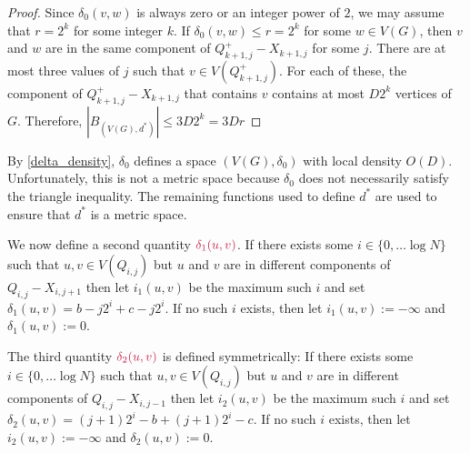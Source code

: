 \documentclass{patmorin}
\makeatletter
\renewcommand{\ge}{\geqslant}
\renewcommand{\le}{\leqslant}
\newcommand{\pat}[1]{\textcolor{Blue}{Pat: #1}}
\newcommand{\gwen}[1]{\textcolor{Purple}{Gwen: #1}}
\def\mathcolor#1#{\@mathcolor{#1}}
\def\@mathcolor#1#2#3{%
  \protect\leavevmode
  \begingroup
    \color#1{#2}#3%
  \endgroup
}
\newcommand{\mathdefin}[1]{\mathcolor{brightmaroon}{#1}}
\makeatother
\begin{document}
\begin{proof}
  Since $\delta_0(v,w)$ is always zero or an integer power of $2$, we may assume that $r=2^k$ for some integer $k$.  If $\delta_0(v,w)\le r=2^k$ for some $w\in V(G)$, then $v$ and $w$ are in the same component of $Q^+_{k+1,j}-X_{k+1,j}$ for some $j$.
  There are at most three values of $j$ such that $v\in V(Q^+_{k+1,j})$.  For each of these, the component of $Q^+_{k+1,j}-X_{k+1,j}$ that contains $v$ contains at most $D2^{k}$ vertices of $G$. Therefore, $|B_{(V(G),d^*)}| \le 3D 2^{k}= 3Dr$
\end{proof}

By \cref{delta_density}, $\delta_0$ defines a space $(V(G),\delta_0)$ with local density $O(D)$.  Unfortunately, this is not a metric space because $\delta_0$ does not necessarily satisfy the triangle inequality.  The remaining functions used to define $d^*$ are used to ensure that $d^*$ is a metric space.

We now define a second quantity $\mathdefin{\delta_1(u,v)}$.  If there exists some $i\in\{0,\ldots\log N\}$ such that $u,v\in V(Q_{i,j})$ but $u$ and $v$ are in different components of $Q_{i,j}-X_{i,j+1}$ then let $i_1(u,v)$ be the maximum such $i$ and set $\delta_1(u,v)=b-j2^i + c-j2^i$. If no such $i$ exists, then let $i_1(u,v):=-\infty$ and $\delta_1(u,v):=0$.

The third quantity $\mathdefin{\delta_2(u,v)}$ is defined symmetrically: If there exists some $i\in\{0,\ldots\log N\}$ such that $u,v\in V(Q_{i,j})$ but $u$ and $v$ are in different components of $Q_{i,j}-X_{i,j-1}$ then let $i_2(u,v)$ be the maximum such $i$ and set $\delta_2(u,v)=(j+1)2^i-b + (j+1)2^i-c$. If no such $i$ exists, then let $i_2(u,v):=-\infty$ and $\delta_2(u,v):=0$.
\end{document}

